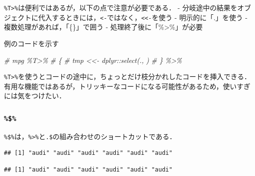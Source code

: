 \documentclass[
]{article}
\newenvironment{Shaded}{\begin{snugshade}}{\end{snugshade}}
\newcommand{\CommentTok}[1]{\textcolor[rgb]{0.56,0.35,0.01}{\textit{#1}}}
\newcommand{\FunctionTok}[1]{\textcolor[rgb]{0.00,0.00,0.00}{#1}}
\newcommand{\NormalTok}[1]{#1}
\newcommand{\SpecialCharTok}[1]{\textcolor[rgb]{0.00,0.00,0.00}{#1}}
\begin{document}
\texttt{\%T\textgreater{}\%}は便利ではあるが，以下の点で注意が必要である．
- 分岐途中の結果をオブジェクトに代入するときには，\texttt{\textless{}-}ではなく，\texttt{\textless{}\textless{}-}を使う
- 明示的に「.」を使う
- 複数処理があれば，「\{\}」で囲う
- 処理終了後に「\%\textgreater\%」が必要

例のコードを示す

\begin{Shaded}
\begin{Highlighting}[]
  \CommentTok{\#  mpg \%T\textgreater{}\%}
  \CommentTok{\#    \{}
  \CommentTok{\#      tmp \textless{}\textless{}{-} dplyr::select(., ) }
  \CommentTok{\#    \} \%\textgreater{}\%}
\end{Highlighting}
\end{Shaded}

\texttt{\%T\textgreater{}\%}を使うとコードの途中に，ちょっとだけ枝分かれしたコードを挿入できる．
有用な機能ではあるが，トリッキーなコードになる可能性があるため，使いすぎには気をつけたい．

\hypertarget{section-1}{%
\subsubsection{\texorpdfstring{\texttt{\%\$\%}}{\%\$\%}}\label{section-1}}

\texttt{\%\$\%}は，\texttt{\%\textgreater{}\%}と\texttt{.\$}の組み合わせのショートカットである．

\begin{Shaded}
\end{Shaded}

\begin{verbatim}
## [1] "audi" "audi" "audi" "audi" "audi" "audi"
\end{verbatim}

\begin{Shaded}
\end{Shaded}

\begin{verbatim}
## [1] "audi" "audi" "audi" "audi" "audi" "audi"
\end{verbatim}
\end{document}
